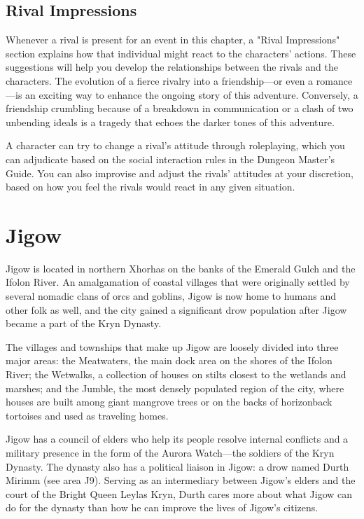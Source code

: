 \documentclass[10pt,a4paper,twoside,bg=print,twocolumn,openany,nodeprecatedcode]{dndbook}
\begin{document}
\subsection{Rival Impressions}
Whenever a rival is present for an event in this chapter, a "Rival Impressions" section explains how that individual might react to the characters' actions. These suggestions will help you develop the relationships between the rivals and the characters. The evolution of a fierce rivalry into a friendship—or even a romance—is an exciting way to enhance the ongoing story of this adventure. Conversely, a friendship crumbling because of a breakdown in communication or a clash of two unbending ideals is a tragedy that echoes the darker tones of this adventure.

A character can try to change a rival's attitude through roleplaying, which you can adjudicate based on the social interaction rules in the Dungeon Master's Guide. You can also improvise and adjust the rivals' attitudes at your discretion, based on how you feel the rivals would react in any given situation.

\section{Jigow}
Jigow is located in northern Xhorhas on the banks of the Emerald Gulch and the Ifolon River. An amalgamation of coastal villages that were originally settled by several nomadic clans of orcs and goblins, Jigow is now home to humans and other folk as well, and the city gained a significant drow population after Jigow became a part of the Kryn Dynasty.

The villages and townships that make up Jigow are loosely divided into three major areas: the Meatwaters, the main dock area on the shores of the Ifolon River; the Wetwalks, a collection of houses on stilts closest to the wetlands and marshes; and the Jumble, the most densely populated region of the city, where houses are built among giant mangrove trees or on the backs of horizonback tortoises and used as traveling homes.

Jigow has a council of elders who help its people resolve internal conflicts and a military presence in the form of the Aurora Watch—the soldiers of the Kryn Dynasty. The dynasty also has a political liaison in Jigow: a drow named Durth Mirimm (see area J9). Serving as an intermediary between Jigow's elders and the court of the Bright Queen Leylas Kryn, Durth cares more about what Jigow can do for the dynasty than how he can improve the lives of Jigow's citizens.
\end{document}

